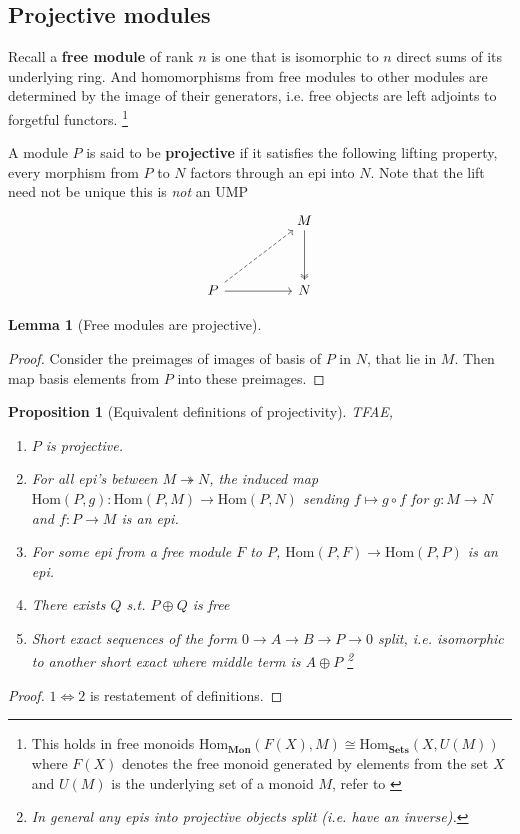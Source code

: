 \documentclass[12pt]{article}
\numberwithin{equation}{section}
\newcommand{\Hom}{{\mathrm{Hom}}}
\newtheorem{lemma}[theorem]{Lemma}
\newtheorem{proposition}{Proposition}[section]
\begin{document}
	
	\begin{appendices}
	\section{Projective modules}
	Recall a\textbf{ free module} of rank $n$ is one that is isomorphic to $n$ direct sums of its underlying ring. And homomorphisms from free modules to other modules are determined by the image of their generators, i.e. free objects are left adjoints to forgetful functors. \footnote{This holds in free monoids $\mathrm{Hom}_\mathbf{Mon}(F(X), M) \cong \mathrm{Hom}_\mathbf{Sets} (X, U(M))$ where $F(X)$ denotes the free monoid generated by elements from the set $X$ and $U(M)$ is the underlying set of a monoid $M$, refer to \cite[p. ~208]{Awodey} }
	
	A module $P$ is said to be \textbf{projective} if it satisfies the following lifting property, every morphism from $P$ to $N$ factors through an epi into $N$. Note that the lift need not be unique this is \textit{not} an UMP
	\[\begin{tikzcd}
		&& M \\
		\\
		P && N
		\arrow[two heads, from=1-3, to=3-3]
		\arrow[from=3-1, to=3-3]
		\arrow[dashed, from=3-1, to=1-3]
	\end{tikzcd}\]
	\begin{lemma}[Free modules are projective]
	\end{lemma}
	\begin{proof}
		Consider the preimages of images of basis of $P$ in $N$, that lie in $M$. Then map basis elements from $P$ into these preimages.
	\end{proof}
	\begin{proposition}[Equivalent definitions of projectivity]
		TFAE,
		\begin{enumerate}
			\item $P$ is projective.
			\item For all epi's between $M\twoheadrightarrow N$, the induced map $\Hom(P,g):\mathrm{Hom}(P,M) \to \mathrm{Hom}(P,N)$ sending $f \mapsto g \circ f$ for $g:M \to N$ and $f:P \to M$ is an epi.
			\item For some epi from a free module $F$ to $P$, $\mathrm{Hom}(P,F) \to \mathrm{Hom}(P,P)$ is an epi.
			\item There exists $Q$ s.t. $P \oplus Q$ is free
			\item Short exact sequences of the form $0 \to A \to B \to P \to 0$ split, i.e. isomorphic to another short exact where middle term is $A \oplus P$ \footnote{In general any epis into projective objects split (i.e. have an inverse).}
		\end{enumerate}
	\end{proposition}
	\begin{proof}
		$1 \iff 2$ is restatement of definitions.
		

\end{proof}
\end{appendices}
\end{document}
